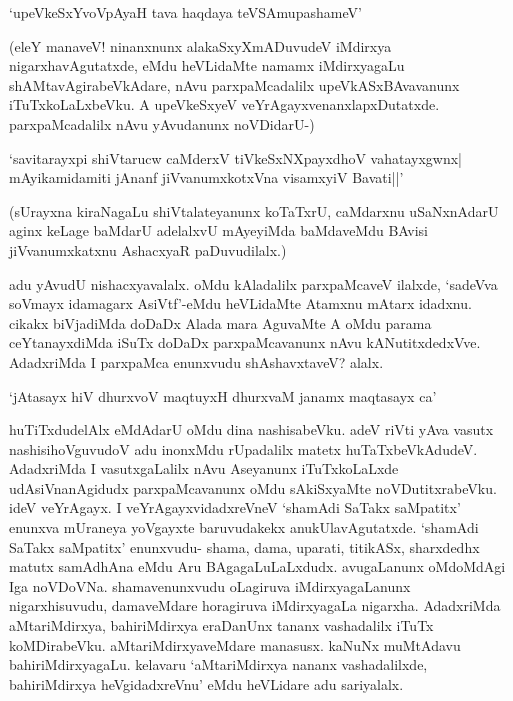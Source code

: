 \begin{shloka}
`upeVkeSxYvoVpAyaH tava haqdaya teVSAmupashameV'
\end{shloka}

(eleY manaveV! ninanxnunx alakaSxyXmADuvudeV iMdirxya nigarxhavAgutatxde, eMdu heVLidaMte namamx iMdirxyagaLu shAMtavAgirabeVkAdare, nAvu parxpaMcadalilx upeVkASxBAvavanunx iTuTxkoLaLxbeVku. A upeVkeSxyeV veYrAgayxvenanxlapxDutatxde. parxpaMcadalilx nAvu yAvudanunx noVDidarU-)

\begin{shloka}
`savitarayxpi shiVtarucw caMderxV tiVkeSxNX\s payxdhoV vahatayxgwnx|\\
mAyikamidamiti jAnanf jiVvanumxkotxVna visamxyiV Bavati||'
\end{shloka}

(sUrayxna kiraNagaLu shiVtalateyanunx koTaTxrU, caMdarxnu uSaNxnAdarU aginx keLage baMdarU adelalxvU mAyeyiMda baMdaveMdu BAvisi jiVvanumxkatxnu AshacxyaR paDuvudilalx.)

adu yAvudU nishacxyavalalx. oMdu kAladalilx parxpaMcaveV ilalxde, `sadeVva soVmayx idamagarx AsiVtf'-eMdu heVLidaMte Atamxnu mAtarx idadxnu. cikakx biVjadiMda doDaDx Alada mara AguvaMte A oMdu parama ceYtanayxdiMda iSuTx doDaDx parxpaMcavanunx nAvu kANutitxdedxVve. AdadxriMda I parxpaMca enunxvudu shAshavxtaveV? alalx.

\begin{shloka}
`jAtasayx hiV dhurxvoV maqtuyxH dhurxvaM janamx maqtasayx ca'
\end{shloka} 

huTiTxdudelAlx eMdAdarU oMdu dina nashisabeVku. adeV riVti yAva vasutx nashisihoVguvudoV adu inonxMdu rUpadalilx matetx huTaTxbeVkAdudeV. AdadxriMda I vasutxgaLalilx nAvu Aseyanunx iTuTxkoLaLxde udAsiVnanAgidudx parxpaMcavanunx oMdu sAkiSxyaMte noVDutitxrabeVku. ideV veYrAgayx. I veYrAgayxvidadxreVneV `shamAdi SaTakx saMpatitx' enunxva mUraneya yoVgayxte baruvudakekx anukUlavAgutatxde. `shamAdi SaTakx saMpatitx' enunxvudu- shama, dama, uparati, titikASx, sharxdedhx matutx samAdhAna eMdu Aru BAgagaLuLaLxdudx. avugaLanunx oMdoMdAgi Iga noVDoVNa. shamavenunxvudu oLagiruva iMdirxyagaLanunx nigarxhisuvudu, damaveMdare horagiruva iMdirxyagaLa nigarxha. AdadxriMda aMtariMdirxya, bahiriMdirxya eraDanUnx tananx vashadalilx iTuTx koMDirabeVku. aMtariMdirxyaveMdare manasusx. kaNuNx muMtAdavu bahiriMdirxyagaLu. kelavaru `aMtariMdirxya nananx vashadalilxde, bahiriMdirxya heVgidadxreVnu' eMdu heVLidare adu sariyalalx.
 
